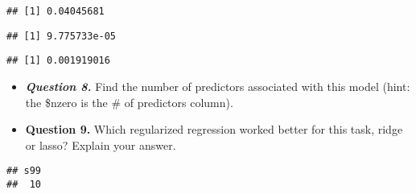 \documentclass[
]{article}
\newenvironment{Shaded}{\begin{snugshade}}{\end{snugshade}}
\newcommand{\CommentTok}[1]{\textcolor[rgb]{0.56,0.35,0.01}{\textit{#1}}}
\newcommand{\FloatTok}[1]{\textcolor[rgb]{0.00,0.00,0.81}{#1}}
\newcommand{\NormalTok}[1]{#1}
\newcommand{\SpecialCharTok}[1]{\textcolor[rgb]{0.00,0.00,0.00}{#1}}
\providecommand{\tightlist}{%
  \setlength{\itemsep}{0pt}\setlength{\parskip}{0pt}}
\begin{document}
\begin{verbatim}
## [1] 0.04045681
\end{verbatim}

\begin{Shaded}
\end{Shaded}

\begin{verbatim}
## [1] 9.775733e-05
\end{verbatim}

\begin{Shaded}
\end{Shaded}

\begin{verbatim}
## [1] 0.001919016
\end{verbatim}

\begin{itemize}
\tightlist
\item
  \textbf{\emph{Question 8.}} Find the number of predictors associated
  with this model (hint: the \$nzero is the \# of predictors column).
\item
  \textbf{Question 9.} Which regularized regression worked better for
  this task, ridge or lasso? Explain your answer.
\end{itemize}

\begin{Shaded}
\end{Shaded}

\begin{verbatim}
## s99 
##  10
\end{verbatim}

\begin{Shaded}
\end{Shaded}
\end{document}
